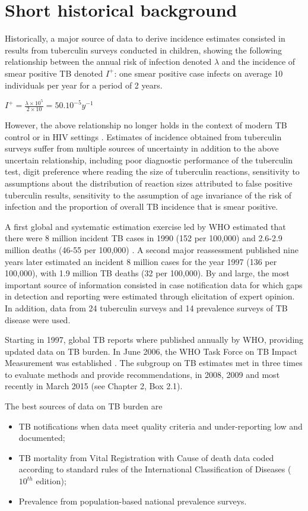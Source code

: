 \section{Short historical background}

Historically, a major source of data to derive incidence estimates consisted in results from tuberculin surveys conducted in children\cite{Styblo1985}, showing the following relationship between the annual risk of infection denoted $\lambda$ and the incidence of smear positive TB denoted $I^+$: one smear positive case infects on average 10 individuals per year for a period of 2 years.

$I^+ = \frac{\lambda \times 10^5}{2 \times 10} = 50.10^{-5} y^{-1}$

However, the above relationship no longer holds in the context of modern TB control or in HIV settings \cite{18235886}. Estimates of incidence obtained from tuberculin surveys suffer from multiple sources of uncertainty in addition to the above uncertain relationship, including poor diagnostic performance of the tuberculin test, digit preference where reading the size of tuberculin reactions, sensitivity to assumptions about the distribution of reaction sizes attributed to false positive tuberculin results, sensitivity to the assumption of age invariance of the risk of infection and the proportion of overall TB incidence that is smear positive. 

A first global and systematic estimation exercise led by WHO estimated that there were 8 million incident TB cases in 1990 (152 per 100,000) and 2.6-2.9 million deaths (46-55 per 100,000) \cite{1600578}. A second major reassessment published nine years later \cite{10517722} estimated an incident 8 million cases for the year 1997 (136 per 100,000), with 1.9 million TB deaths (32 per 100,000). By and large, the most important source of information consisted in case notification data for which gaps in detection and reporting were estimated through elicitation of expert opinion. In addition, data from 24 tuberculin surveys and 14 prevalence surveys of TB disease were used.

Starting in 1997, global TB reports where published annually by WHO, providing updated data on TB burden. In June 2006, the WHO Task Force on TB Impact Measurement was established \cite{18201929}. The subgroup on TB estimates met in three times to evaluate methods and provide recommendations, in 2008, 2009 and most recently in March 2015 (see Chapter 2, Box 2.1).

The best sources of data on TB burden are 
\begin{itemize}
\item TB notifications when data meet quality criteria and under-reporting low and documented;
\item TB mortality from Vital Registration with Cause of death data coded according to standard rules of the International Classification of Diseases ($10^{th}$ edition);
\item Prevalence from population-based national prevalence surveys.
\end{itemize}




  
  
  
  
  
  
  
  
  
  
  